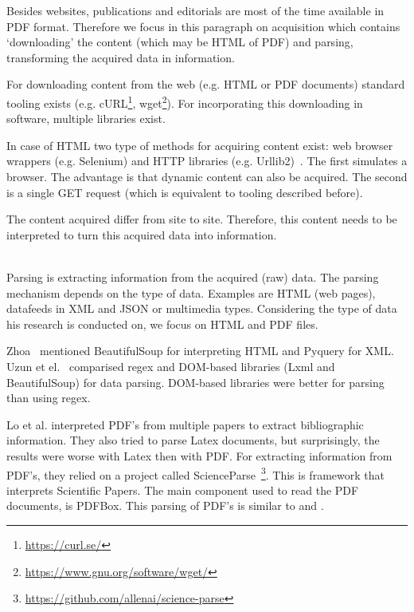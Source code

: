 \documentclass{ou-report}
\begin{document}
Besides websites, publications and
editorials are most of the time available in PDF format. Therefore we focus in this 
paragraph on acquisition which contains `downloading' the content (which may be 
HTML of PDF) and parsing, transforming the acquired data in information.

For downloading content from the web (e.g. HTML or PDF documents) standard tooling 
exists (e.g. cURL\footnote{\url{https://curl.se/}}, 
wget\footnote{\url{https://www.gnu.org/software/wget/}}). For incorporating this downloading in software, multiple
libraries exist.

In case of HTML two type of methods for acquiring content exist: web browser wrappers 
(e.g. Selenium) and HTTP libraries (e.g. Urllib2)~\cite{zhao2017}. The first 
simulates a browser. The advantage is that dynamic content can also be acquired. 
The second is a single GET request (which is equivalent to tooling described before).

The content acquired differ from site to site. Therefore, this content needs to be
interpreted to turn this acquired data into information.

\ \\
Parsing is extracting information from the acquired (raw) data. The parsing 
mechanism depends on the type of data.  Examples are HTML (web pages), datafeeds 
in XML and JSON or multimedia types. Considering the type of data his research 
is conducted on, we focus on HTML and PDF files.

Zhoa~\cite{zhao2017} mentioned BeautifulSoup for interpreting HTML and Pyquery
for XML. Uzun et el.~\cite{uzun2018comparison} comparised regex and DOM-based 
libraries (Lxml and BeautifulSoup) for data parsing. DOM-based libraries were 
better for parsing than using regex.

Lo et al. interpreted PDF's from multiple papers \cite{lo-etal-2020-s2orc} to 
extract bibliographic information. They also tried to parse Latex documents, but
surprisingly, the results were worse with Latex then with PDF. For extracting 
information from PDF's, they relied on a project called
ScienceParse~\footnote{\url{https://github.com/allenai/science-parse}}. This is 
framework that interprets Scientific Papers. The main component used to read the
PDF documents, is PDFBox.
This parsing of PDF's is similar to \cite{niu2014realization} and \cite{BK2017}.
\end{document}
